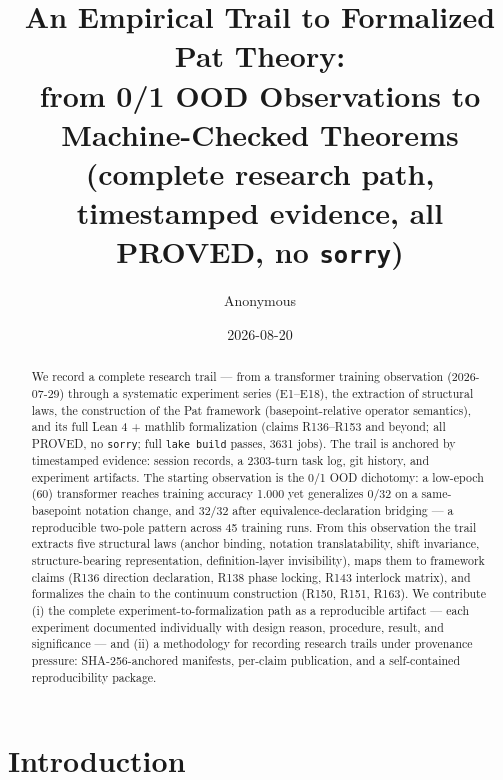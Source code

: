 \documentclass[sigplan,10pt,anonymous,review]{acmart}
\begin{document}
\title{An Empirical Trail to Formalized Pat Theory:\\
from 0/1 OOD Observations to Machine-Checked Theorems\\
(complete research path, timestamped evidence, all PROVED, no \texttt{sorry})}

\author{Anonymous}


\date{2026-08-20}

\begin{abstract}
We record a complete research trail --- from a transformer training observation
(2026-07-29) through a systematic experiment series (E1--E18), the extraction of
structural laws, the construction of the Pat framework (basepoint-relative
operator semantics), and its full Lean 4 + mathlib formalization (claims
R136--R153 and beyond; all PROVED, no \texttt{sorry}; full \texttt{lake build}
passes, 3631 jobs). The trail is anchored by timestamped evidence: session
records, a 2303-turn task log, git history, and experiment artifacts. The
starting observation is the 0/1 OOD dichotomy: a low-epoch (60) transformer
reaches training accuracy 1.000 yet generalizes 0/32 on a same-basepoint
notation change, and 32/32 after equivalence-declaration bridging --- a
reproducible two-pole pattern across 45 training runs. From this observation
the trail extracts five structural laws (anchor binding, notation
translatability, shift invariance, structure-bearing representation,
definition-layer invisibility), maps them to framework claims (R136 direction
declaration, R138 phase locking, R143 interlock matrix), and formalizes the
chain to the continuum construction (R150, R151, R163). We contribute (i) the
complete experiment-to-formalization path as a reproducible artifact --- each
experiment documented individually with design reason, procedure, result, and
significance --- and (ii) a methodology for recording research trails under
provenance pressure: SHA-256-anchored manifests, per-claim publication, and a
self-contained reproducibility package.
\end{abstract}


\maketitle

\section{Introduction}
\end{document}
